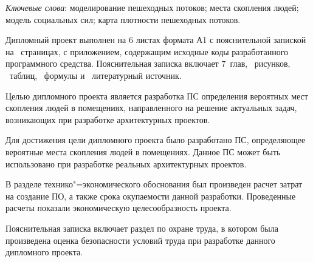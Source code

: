 \thispagestyle{empty}

\emph{Ключевые слова}: моделирование пешеходных потоков; места скопления людей; модель социальных сил; карта плотности пешеходных потоков.

\vspace{4\parsep}

Дипломный проект выполнен на 6 листах формата А1 с пояснительной запиской на~\pageref*{LastPage} страницах, с приложением, содержащим исходные коды разработанного программного средства.
Пояснительная записка включает 7~глав, \totfig{}~рисунков, \tottab{}~таблиц, \toteq{}~формулы и \totref{}~литературный источник.

Целью дипломного проекта является разработка ПС определения вероятных мест скопления людей в помещениях,
направленного на решение актуальных задач, возникающих при разработке архитектурных проектов.

Для достижения цели дипломного проекта было разработано ПС, определяющее вероятные места скопления людей в помещениях.
Данное ПС может быть использовано при разработке реальных архитектурных проектов.

В разделе технико"=экономического обоснования был произведен расчет затрат на создание ПО, а также срока окупаемости данной разработки.
Проведенные расчеты показали экономическую целесообразность проекта.

Пояснительная записка включает раздел по охране труда, в котором была произведена оценка безопасности условий труда при разработке данного дипломного проекта.

\clearpage

